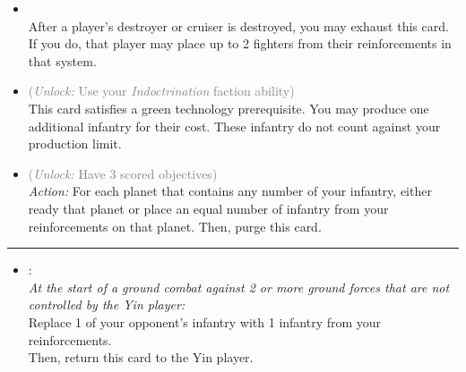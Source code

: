 \begin{multicols}{2}
\begin{itemize}
\item {}\\
After a player's destroyer or cruiser is destroyed, you may exhaust this card. If you do, that player may place up to 2 fighters from their reinforcements in that system.
\item {} \textcolor{gray}{(\emph{Unlock:} Use your \emph{Indoctrination} faction ability)}\\
This card satisfies a green technology prerequisite. You may produce one additional infantry for their cost. These infantry do not count against your production limit.
\item {} \textcolor{gray}{(\emph{Unlock:} Have 3 scored objectives)}\\
\emph{Action:} For each planet that contains any number of your infantry, either ready that planet or place an equal number of infantry from your reinforcements on that planet. Then, purge this card. 
\end{itemize}

\vspace{-10pt}\rule{\hsize}{0.4pt}\vspace{5pt}


\begin{itemize}
\item {}:\\
\emph{At the start of a ground combat against 2 or more ground forces that are not controlled by the Yin player:}\\
Replace 1 of your opponent's infantry with 1 infantry from your reinforcements.\\
Then, return this card to the Yin player.
\end{itemize}

\end{multicols}



